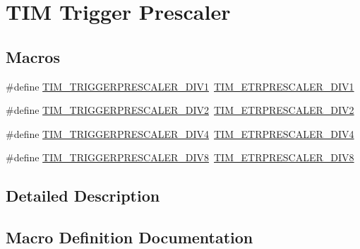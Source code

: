 \hypertarget{group___t_i_m___trigger___prescaler}{}\section{T\+IM Trigger Prescaler}
\label{group___t_i_m___trigger___prescaler}
\subsection*{Macros}
\begin{DoxyCompactItemize}
\item 
\#define \hyperlink{group___t_i_m___trigger___prescaler_ga02ab6f24e367cd972a1e0c1df326a7a3}{T\+I\+M\+\_\+\+T\+R\+I\+G\+G\+E\+R\+P\+R\+E\+S\+C\+A\+L\+E\+R\+\_\+\+D\+I\+V1}~\hyperlink{group___t_i_m___e_t_r___prescaler_gabead5364c62645592e42545ba09ab88a}{T\+I\+M\+\_\+\+E\+T\+R\+P\+R\+E\+S\+C\+A\+L\+E\+R\+\_\+\+D\+I\+V1}
\item 
\#define \hyperlink{group___t_i_m___trigger___prescaler_ga1350c5659a17a66df69b444871907d83}{T\+I\+M\+\_\+\+T\+R\+I\+G\+G\+E\+R\+P\+R\+E\+S\+C\+A\+L\+E\+R\+\_\+\+D\+I\+V2}~\hyperlink{group___t_i_m___e_t_r___prescaler_gaf7fe49f67bdb6b33b9b41953fee75680}{T\+I\+M\+\_\+\+E\+T\+R\+P\+R\+E\+S\+C\+A\+L\+E\+R\+\_\+\+D\+I\+V2}
\item 
\#define \hyperlink{group___t_i_m___trigger___prescaler_ga195dd56e15ea4733e19518fb431dfb8d}{T\+I\+M\+\_\+\+T\+R\+I\+G\+G\+E\+R\+P\+R\+E\+S\+C\+A\+L\+E\+R\+\_\+\+D\+I\+V4}~\hyperlink{group___t_i_m___e_t_r___prescaler_gaa09da30c3cd28f1fe6b6f3f599a5212c}{T\+I\+M\+\_\+\+E\+T\+R\+P\+R\+E\+S\+C\+A\+L\+E\+R\+\_\+\+D\+I\+V4}
\item 
\#define \hyperlink{group___t_i_m___trigger___prescaler_ga78edbcf4caf228de0daa4b7f698f578f}{T\+I\+M\+\_\+\+T\+R\+I\+G\+G\+E\+R\+P\+R\+E\+S\+C\+A\+L\+E\+R\+\_\+\+D\+I\+V8}~\hyperlink{group___t_i_m___e_t_r___prescaler_ga834e38200874cced108379b17a24d0b7}{T\+I\+M\+\_\+\+E\+T\+R\+P\+R\+E\+S\+C\+A\+L\+E\+R\+\_\+\+D\+I\+V8}
\end{DoxyCompactItemize}


\subsection{Detailed Description}


\subsection{Macro Definition Documentation}
